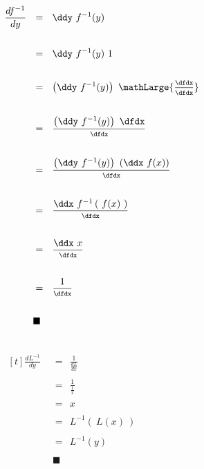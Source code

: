 \begin{description}[leftmargin=*, labelsep=3em, itemsep=3em]
	$\begin{aligned}[t]
	\frac{df^{-1}}{dy} ~~ &= ~~ \ddy ~ f^{-1}(y) \\ \\
	&= ~~ \ddy ~ f^{-1}(y) ~ 1 \\ \\
	&= ~~ \left( \ddy ~ f^{-1}(y) \right) ~ \mathLarge{ \frac{ \underset{ \dfdx }{~} }{ \overset{ \dfdx }{~} } } \\ \\
	&= ~~ \frac{ \left( \ddy ~ f^{-1}(y) \right) ~ \dfdx }{ \overset{ \dfdx }{~} } \\ \\
	&= ~~ \frac{ \left( \ddy ~ f^{-1}(y) \right) ~ \left( \ddx ~ f(x) \right) }{ \overset{ \dfdx }{~} } \\ \\
	&= ~~ \frac{ \ddx ~ f^{-1}\left( ~ f(x) ~ \right) }{ \overset{ \dfdx }{~} } \\ \\
	&= ~~ \frac{ \ddx ~ x }{ \overset{ \dfdx }{~} } \\ \\
	&= ~~ \frac{ 1 }{ \overset{ \dfdx }{~} } \\ \\
	&\blacksquare
	\end{aligned}$ \\
	
	
	\newpage
	
	
	\item[\textnormal{c) \quad iv)}] \hfill
	
	~\\
	
	$\begin{aligned}[t]
	\frac{dL^{-1}}{dy} ~~ &= ~~ \frac{1}{ \frac{dL}{dx} } \\ \\
	&= ~~ \frac{1}{ \frac{1}{x} } \\ \\
	&= ~~ x \\ \\
	&= ~~ L^{-1}\left( ~ L(x) ~ \right) \\ \\
	&= ~~ L^{-1}(y) \\ \\
	&\blacksquare
	\end{aligned}$ \\
	
	
	
	
\end{description}

 


